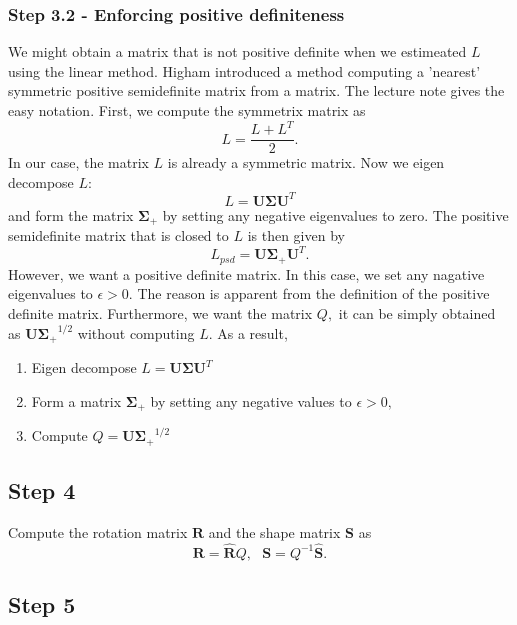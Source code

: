 \subsubsection{Step 3.2 - Enforcing positive definiteness}

We might obtain a matrix that is not positive definite when we estimeated $ L $ using the linear method. 
Higham \cite{Higham} introduced a method computing a 'nearest' symmetric positive semidefinite matrix from a matrix. The lecture note \cite{cse252b} gives the easy notation. 
First, we compute the symmetrix matrix as
$$ L = \frac{L + L^T}{2}. $$
In our case, the matrix $ L $ is already a symmetric matrix. 
Now we eigen decompose $ L $:
$$ L = \mathbf{U} \mathbf{\Sigma} \mathbf{U}^T $$
and form the matrix $ \mathbf{\Sigma_+} $ by setting any negative eigenvalues to zero. The positive semidefinite matrix that is closed to $ L $ is then given by
$$ L_{psd} = \mathbf{U} \mathbf{\Sigma_+} \mathbf{U}^T. $$
However, we want a positive definite matrix. 
In this case, we set any nagative eigenvalues to $ \epsilon > 0. $ 
The reason is apparent from the definition of the positive definite matrix. 
Furthermore, we want the matrix $ Q, $ it can be simply obtained as $ \mathbf{U} \mathbf{\Sigma_+}^{1/2} $ without computing $ L. $
As a result, 
\begin{enumerate} 
\item Eigen decompose $ L = \mathbf{U} \mathbf{\Sigma} \mathbf{U}^T $ 
\item Form a matrix $ \mathbf{\Sigma_+} $ by setting any negative values to $ \epsilon > 0, $ 
\item Compute $ Q = \mathbf{U} \mathbf{\Sigma_+}^{1/2} $
\end{enumerate}

\subsection{Step 4}
Compute the rotation matrix $ \mathbf{R} $ and the shape matrix $ \mathbf{S} $ as
$$ \mathbf{R} = \hat{\mathbf{R}}Q, \ \ \ \mathbf{S} = Q^{-1}\hat{\mathbf{S}}. $$

\subsection{Step 5}

